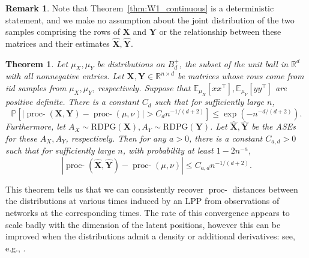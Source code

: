 \documentclass[12pt]{article}
\newcommand{\RR}{\mathbb{R}}
\newcommand{\EE}{\mathbb{E}}
\newcommand{\PP}{\mathbb{P}}
\newtheorem{thm}{Theorem}
\theoremstyle{definition}
\newtheorem{remark}{Remark}
\newcommand{\bX}{\mathbf{X}}
\newcommand{\bY}{\mathbf{Y}}
\newcommand{\procwp}[1][2]{\mathop{\mbox{proc-$W_#1$}}}
\newcommand{\procwphat}[1][2]{\mathop{\mbox{proc-$\hat{W}_#1$}}}
\begin{document}
\begin{remark}
    Note that Theorem~\ref{thm:W1_continuous} is a deterministic statement, and we make no assumption about the joint distribution of the two samples comprising the rows of $\bX$ and $\bY$ or the relationship between these matrices and their estimates $\hat{\bX},\hat{\bY}$.
\end{remark}


\begin{thm}\label{thm:W1_as_converge}
Let $\mu_X,\mu_Y$ be distributions on $B_d^+$, the subset of the unit ball in $\RR^d$ with all nonnegative entries. Let $\bX,\bY\in\RR^{n\times d}$ be matrices whose rows come from iid samples from $\mu_X,\mu_Y$, respectively. Suppose that $\EE_{\mu_X}[xx^\top], \EE_{\mu_Y}[yy^\top]$ are positive definite. There is a constant $C_d$ such that for sufficiently large $n$,
$$\PP[|\procwphat[1](\bX,\bY)-\procwp[1](\mu,\nu)|>C_d n^{-1/(d+2)}] \leq \exp(-n^{-d/(d+2)}).$$
Furthermore, let $A_X\sim\mathrm{RDPG}(\bX), A_Y\sim\mathrm{RDPG}(\bY)$. Let $\hat{\bX}, \hat{\bY}$ be the ASEs for these $A_X,A_Y$, respectively. Then for any $a>0$, there is a constant $C_{a,d}>0$ such that for sufficiently large $n$, with probability at least $1-2n^{-a}$,
$$|\procwphat[1](\hat{\bX},\hat{\bY})-\procwp[1](\mu,\nu)| \leq C_{a,d} n^{-1/(d+2)}.$$
\end{thm}

This theorem tells us that we can consistently recover $\procwp[1]$ distances between the distributions at various times induced by an LPP from observations of networks at the corresponding times. The rate of this convergence appears to scale badly with the dimension of the latent positions, however this can be improved when the distributions admit a density or additional derivatives: see, e.g., \cite{chewi2025statistical}.
\end{document}
